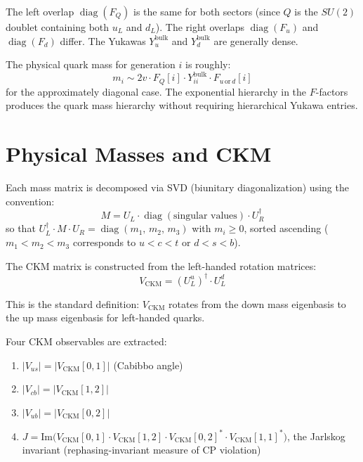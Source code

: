 \documentclass[11pt]{article}
\begin{document}
The left overlap
$\operatorname{diag}(F_Q)$ is the same for both sectors (since $Q$ is the
$SU(2)$ doublet containing both $u_L$ and $d_L$).  The right overlaps
$\operatorname{diag}(F_u)$ and $\operatorname{diag}(F_d)$ differ.  The Yukawas
$Y_u^{\mathrm{bulk}}$ and $Y_d^{\mathrm{bulk}}$ are generally dense.

The physical quark mass for generation $i$ is roughly:
\begin{equation}
  m_i \sim 2v \cdot F_Q[i] \cdot Y^{\mathrm{bulk}}_{ii}
    \cdot F_{u\,\text{or}\,d}[i]
\end{equation}
for the approximately diagonal case.  The exponential hierarchy in the
$F$-factors produces the quark mass hierarchy without requiring hierarchical
Yukawa entries.

\section{Physical Masses and CKM}
\label{sec:step9}

Each mass matrix is decomposed via SVD (biunitary diagonalization) using the
convention:
\begin{equation}
  M = U_L \cdot \operatorname{diag}(\text{singular values})
    \cdot U_R^\dagger
\end{equation}
so that $U_L^\dagger \cdot M \cdot U_R =
\operatorname{diag}(m_1,\,m_2,\,m_3)$ with $m_i \ge 0$, sorted ascending
($m_1 < m_2 < m_3$ corresponds to $u < c < t$ or $d < s < b$).

The CKM matrix is constructed from the left-handed rotation matrices:
\begin{equation}
  V_{\mathrm{CKM}} = (U_L^u)^\dagger \cdot U_L^d
\end{equation}

This is the standard definition: $V_{\mathrm{CKM}}$ rotates from the down mass
eigenbasis to the up mass eigenbasis for left-handed quarks.

Four CKM observables are extracted:
\begin{enumerate}
  \item $|V_{us}| = |V_{\mathrm{CKM}}[0,1]|$ (Cabibbo angle)
  \item $|V_{cb}| = |V_{\mathrm{CKM}}[1,2]|$
  \item $|V_{ub}| = |V_{\mathrm{CKM}}[0,2]|$
  \item $J = \mathrm{Im}\!\bigl(V_{\mathrm{CKM}}[0,1] \cdot
    V_{\mathrm{CKM}}[1,2] \cdot V_{\mathrm{CKM}}[0,2]^* \cdot
    V_{\mathrm{CKM}}[1,1]^*\bigr)$,
    the Jarlskog invariant (rephasing-invariant measure of CP violation)
\end{enumerate}
\end{document}

